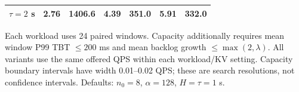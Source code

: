 \begin{table}[t]
\begin{tabular}{lrrrrrr}
$\tau=2$ s & 2.76 & 1406.6 & 4.39 & 351.0 & 5.91 & 332.0 \\
\bottomrule
\end{tabular}
\par\smallskip
\begin{minipage}{0.96\textwidth}\footnotesize
Each workload uses 24 paired windows. Capacity additionally requires mean window P99 TBT $\leq200$ ms and mean backlog growth $\leq\max(2,\lambda)$. All variants use the same offered QPS within each workload/KV setting. Capacity boundary intervals have width 0.01--0.02 QPS; these are search resolutions, not confidence intervals. Defaults: $n_0=8$, $\alpha=128$, $H=\tau=1$ s.
\end{minipage}
\end{table}
